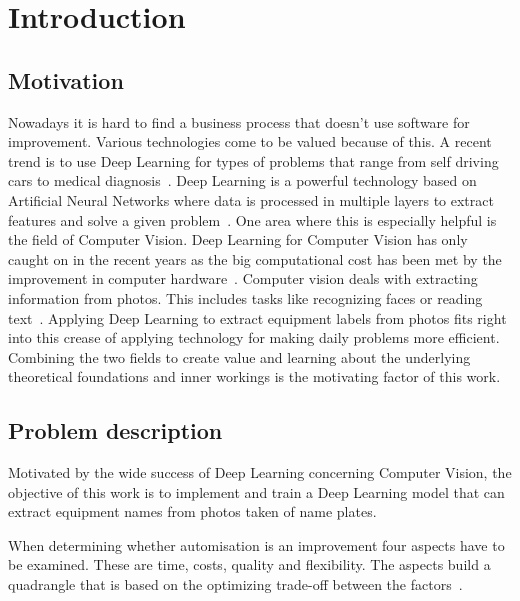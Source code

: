 \chapter{Introduction}\label{ch:intro}

\section{Motivation}
Nowadays it is hard to find a business process that doesn't use software for improvement.
Various technologies come to be valued because of this.
A recent trend is to use Deep Learning for types of problems that range from self driving
cars to medical diagnosis~\cite{balas_handbook_2019}.
Deep Learning is a powerful technology based on Artificial Neural Networks where data is processed
in multiple layers to extract features and solve a given problem~\cite{shrestha_review_2019}.
One area where this is especially helpful is the field of Computer Vision.
Deep Learning for Computer Vision has only caught on in the recent years as the big computational
cost has been met by the improvement in computer hardware~\cite{ponti_everything_2017}.
Computer vision deals with extracting information from photos.
This includes tasks like recognizing faces or reading text~\cite{prince_computer_2012}.
Applying Deep Learning to extract equipment labels from photos fits right into this crease of
applying technology for making daily problems more efficient.
Combining the two fields to create value and learning about the underlying theoretical foundations
and inner workings is the motivating factor of this work.

\section{Problem description}\label{se:problem}
Motivated by the wide success of Deep Learning concerning Computer Vision,
the objective of this work is to implement and train a Deep Learning model that can extract
equipment names from photos taken of name plates.

When determining whether automisation is an improvement four aspects have to be examined.
These are time, costs, quality and flexibility.
The aspects build a quadrangle that is based on the optimizing trade-off between the
factors~\cite{dumas_fundamentals_2013}.

